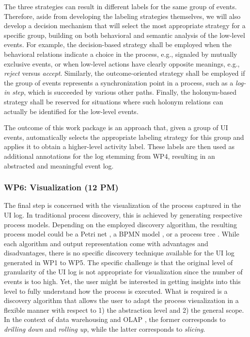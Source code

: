  The three strategies can result in different labels for the same group of events. Therefore, aside from developing the labeling strategies themselves, we will also develop a decision mechanism that will select the most appropriate strategy for a specific group, building on both behavioral and semantic analysis of the low-level events. For example, the decision-based strategy shall be employed when the behavioral relations indicate a choice in the process, e.g., signaled by mutually exclusive events, or when low-level actions have clearly opposite meanings, e.g., \emph{reject} versus \emph{accept}. Similarly, the outcome-oriented strategy shall be employed if the group of events represents a synchronization point in a process, such as a \emph{log-in step}, which is succeeded by various other paths. Finally, the holonym-based strategy shall be reserved for situations where such holonym relations can actually be identified for the low-level events. 

 The outcome of this work package is an approach that, given a group of UI events, automatically selects the appropriate labeling strategy for this group and applies it to obtain a higher-level activity label. These labels are then used as additional annotations for the log stemming from WP4, resulting in an abstracted and meaningful event log. 


\subsubsection{WP6: Visualization (12 PM)}
\label{sec:wp6}

The final step is concerned with the visualization of the process captured in the UI log. In traditional process discovery, this is achieved by generating respective process models. Depending on the employed discovery algorithm, the resulting process model could be a Petri net \cite{van2004workflow}, a BPMN model \cite{conforti2016bpmn}, or a process tree \cite{leemans2013discovering}. While each algorithm and output representation come with advantages and disadvantages, there is no specific discovery technique available for the UI log generated in WP1 to WP5. The specific challenge is that the original level of granularity of the UI log is not appropriate for visualization since the number of events is too high. Yet, the user might be interested in getting insights into this level to fully understand how the process is executed. What is required is a discovery algorithm that allows the user to adapt the process visualization in a flexible manner with respect to 1) the abstraction level and 2) the general scope. In the context of data warehousing and OLAP \cite{chaudhuri1997overview}, the former corresponds to \textit{drilling down} and \textit{rolling up}, while the latter corresponds to \textit{slicing}. 

